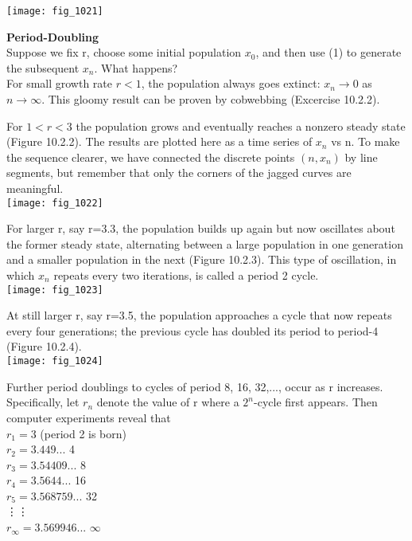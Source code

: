 \documentclass{article}
\newcommand\tab[1][1cm]{\hspace*{#1}}
\begin{document}
\texttt{[image: fig\_1021]}

\textbf {Period-Doubling} \\ \tab
Suppose we fix r, choose some initial population $x_{0}$, and then use (1) to generate the subsequent $x_{n}$. What happens? \\ \tab
For small growth rate $r<1$, the population always goes extinct: $x_{n} \to 0$ as $n \to \infty$. This gloomy result can be proven by cobwebbing (Excercise 10.2.2). \\ \tab

For $1 < r < 3$ the population grows and eventually reaches a nonzero steady state (Figure 10.2.2). The results are plotted here as a time series of $x_{n}$ vs n. To make the sequence clearer, we have connected the discrete points $(n, x_{n})$ by line segments, but remember that only the corners of the jagged curves are meaningful. \\

\texttt{[image: fig\_1022]} 

For larger r, say r=3.3, the population builds up again but now oscillates about the former steady state, alternating between a large population in one generation and a smaller population in the next (Figure 10.2.3). This type of oscillation, in which $x_{n}$ repeats every two iterations, is called a period 2 cycle. \\

\texttt{[image: fig\_1023]} 

At still larger r, say r=3.5, the population approaches a cycle that now repeats every four generations; the previous cycle has doubled its period to period-4 (Figure 10.2.4). \\

\texttt{[image: fig\_1024]}

Further period doublings to cycles of period 8, 16, 32,..., occur as r increases. Specifically, let $r_{n}$ denote the value of r where a $2^{n}$-cycle first appears. Then computer experiments reveal that \\ \tab \tab
$r_{1}=3$ \tab \tab (period 2 is born) \\ \tab \tab
$r_{2}=3.449...$ \tab \tab 4 \\ \tab \tab
$r_{3}=3.54409...$ \tab \tab 8 \\ \tab \tab
$r_{4}=3.5644...$ \tab \tab 16 \\ \tab \tab
$r_{5}=3.568759...$ \tab \tab 32 \\ \tab \tab
\vdots \tab \tab \vdots \\ \tab \tab
$r_{\infty}=3.569946...$ \tab \tab $\infty$ \\
\end{document}
